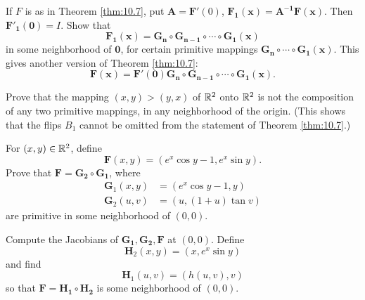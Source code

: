 \begin{myexercise}
    \label{ex:10.3}
    \begin{asparaenum}[(a)]
        \item If $F$ is as in Theorem \ref{thm:10.7}, put 
        $\mathbf{A} = \mathbf{F}'(0)$,
        $\mathbf{F_{1}(x)} = \mathbf{A^{-1}F(x)}$.
        Then $\mathbf{F'_1(0)}=I$.
        Show that 
        \begin{equation*}
            \mathbf{F_1(x) = G_n \circ G_{n-1} \circ \cdots \circ G_1(x)}
        \end{equation*}
        in some neighborhood of $\mathbf{0}$,
        for certain primitive mappings $\mathbf{G_n \circ \cdots \circ G_1(x)}$.
        This gives another version of Theorem \ref{thm:10.7}:
        \begin{equation*}
            \mathbf{F(x) = F'(0) G_n \circ G_{n-1} \circ \cdots \circ G_1(x)}.
        \end{equation*}
        \item Prove that the mapping $(x, y) > (y, x)$ of ${\protect\mathbb R}^2$ onto ${\protect\mathbb R}^2$ is not the composition of any two primitive mappings, in any neighborhood of the origin. 
        (This shows that the flips $B_1$ cannot be omitted from the statement of Theorem \ref{thm:10.7}.)
    \end{asparaenum}
\end{myexercise}

\begin{myexercise}    
    \label{ex:10.4}
    For $(x,y) \in {\protect\mathbb R}^2$, define
    \begin{equation*}
        \mathbf{F}(x,y) = (e^x \cos y - 1, e^x \sin y).
    \end{equation*}
    Prove that $\mathbf{F = G_2 \circ G_1}$, where 
    \begin{align*}
        \mathbf{G}_1 (x,y) &= (e^x \cos y - 1, y) \\
        \mathbf{G}_2 (u,v) &= (u, (1 + u) \tan v) 
    \end{align*}
    are primitive in some neighborhood of $(0, 0)$.

    Compute the Jacobians of $\mathbf{G_1, G_2, F}$ at $(0, 0)$. 
    Define
    \begin{equation*}
        \mathbf{H}_2 (x,y) = (x, e^x \sin y)
    \end{equation*}
    and find 
    \begin{equation*}
        \mathbf{H}_1 (u,v) = (h(u,v), v)
    \end{equation*}
    so that $\mathbf{F = H_1 \circ H_2}$ is some neighborhood of $(0,0)$.
\end{myexercise}



